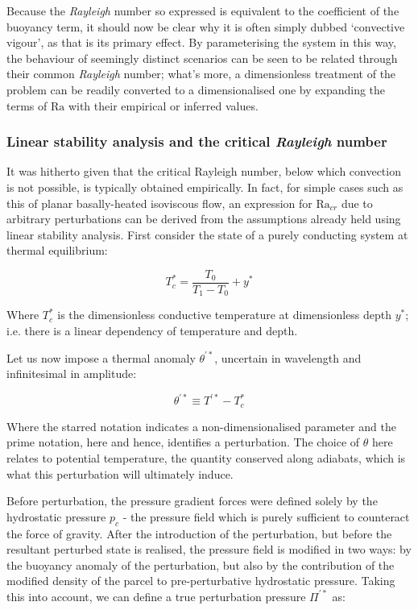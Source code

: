 \documentclass[a4paper,11pt,oneside]{book}
\begin{document}
Because the \textit{Rayleigh} number so expressed is equivalent to the coefficient of the buoyancy term, it should now be clear why it is often simply dubbed `convective vigour', as that is its primary effect. By parameterising the system in this way, the behaviour of seemingly distinct scenarios can be seen to be related through their common \textit{Rayleigh} number; what's more, a dimensionless treatment of the problem can be readily converted to a dimensionalised one by expanding the terms of $\mathrm{Ra}$ with their empirical or inferred values.

\subsubsection{Linear stability analysis and the critical \textit{Rayleigh} number}

It was hitherto given that the critical Rayleigh number, below which convection is not possible, is typically obtained empirically. In fact, for simple cases such as this of planar basally-heated isoviscous flow, an expression for $\mathrm{Ra}_{cr}$ due to arbitrary perturbations can be derived from the assumptions already held using linear stability analysis. First consider the state of a purely conducting system at thermal equilibrium:

\begin{equation}
T_c^* = \frac{T_0}{T_1 - T_0} + y^*
\end{equation}

Where $T_c^*$ is the dimensionless conductive temperature at dimensionless depth $y^*$; i.e. there is a linear dependency of temperature and depth.

Let us now impose a thermal anomaly $\theta^{'*}$, uncertain in wavelength and infinitesimal in amplitude:

\begin{equation}
\theta^{'*} \equiv T^{'*} - T_c^*
\end{equation}

Where the starred notation indicates a non-dimensionalised parameter and the prime notation, here and hence, identifies a perturbation. The choice of $\theta$ here relates to potential temperature, the quantity conserved along adiabats, which is what this perturbation will ultimately induce.

Before perturbation, the pressure gradient forces were defined solely by the hydrostatic pressure $p_c$ - the pressure field which is purely sufficient to counteract the force of gravity. After the introduction of the perturbation, but before the resultant perturbed state is realised, the pressure field is modified in two ways: by the buoyancy anomaly of the perturbation, but also by the contribution of the modified density of the parcel to pre-perturbative hydrostatic pressure. Taking this into account, we can define a true perturbation pressure $\Pi^{'*}$ as:
\end{document}
